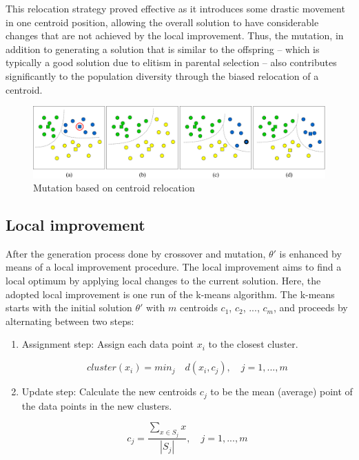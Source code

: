 This relocation strategy proved effective as it introduces some drastic movement in one centroid position, allowing the overall solution to have considerable changes that are not achieved by the local improvement. Thus, the mutation, in addition to generating a solution that is similar to the offspring -- which is typically a good solution due to elitism in parental selection -- also contributes significantly to the population diversity through the biased relocation of a centroid.

\begin{figure}[H]
  \begin{center}
    \includegraphics[width=1.0\textwidth]{img/mutation}
    \caption{Mutation based on centroid relocation}\label{fig:mutation}
  \end{center}
\end{figure}

\subsection{Local improvement}
\label{subsec:local-improvement}
After the generation process done by crossover and mutation, $\theta'$ is enhanced by means of a local improvement procedure. The local improvement aims to find a local optimum by applying local changes to the current solution. Here, the adopted local improvement is one run of the k-means algorithm. The k-means starts with the initial solution $\theta'$ with $m$ centroids $c_1$, $c_2$, ..., $c_m$, and proceeds by alternating between two steps:

\begin{enumerate}

	\item Assignment step: Assign each data point $x_i$ to the closest cluster.
	
	\begin{equation}
	cluster(x_i) = min_j \quad d(x_i, c_j), \quad j = 1,...,m
	\end{equation}
	
	\item Update step: Calculate the new centroids $c_j$ to be the mean (average) point of the data points in the new clusters.
	
	\begin{equation}
	c_j = \frac{\sum_{x \in S_j}x}{\left | S_j \right |}, \quad j = 1,...,m
	\end{equation}
		
\end{enumerate}

